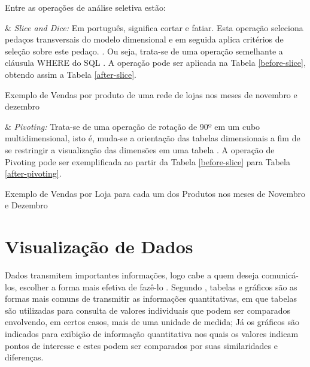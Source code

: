 Entre as operações de análise seletiva estão:

\begin{easylist}[itemize]

& \textit{Slice and Dice:} Em português, significa cortar e fatiar. Esta operação seleciona pedaços transversais do modelo dimensional e em seguida aplica critérios de seleção sobre este pedaço. \cite{andre2000}. Ou seja, trata-se de uma operação semelhante a cláusula WHERE do SQL \cite{valeria2012}. A operação pode ser aplicada na Tabela \ref{before-slice}, obtendo assim a Tabela \ref{after-slice}.


\end{easylist}

\begin{table}[ht]
\centering

\caption{Exemplo de Vendas por produto de uma rede de lojas nos meses de novembro e dezembro}
\label{before-slice}
\end{table}


\begin{table}[ht]
\centering

\label{after-slice}
\end{table}


\begin{easylist}[itemize]

& \textit{Pivoting:} Trata-se de uma operação de rotação de 90º em um cubo multidimensional, isto é, muda-se a orientação das tabelas dimensionais a fim de se restringir a visualização das dimensões em uma tabela \cite{andre2000}. A operação de Pivoting pode ser exemplificada ao partir da Tabela \ref{before-slice} para Tabela \ref{after-pivoting}.


\end{easylist}



\begin{table}[!ht]
\centering

\caption{Exemplo de Vendas por Loja para cada um dos Produtos nos meses de Novembro e Dezembro}
\label{after-pivoting}
\end{table}



\section {Visualização de Dados}

Dados transmitem importantes informações, logo cabe a quem deseja comunicá-los, escolher a forma mais efetiva de fazê-lo \cite{raquel2013}. Segundo , tabelas e gráficos são as formas mais comuns de transmitir as informações quantitativas, em que tabelas são utilizadas para consulta de valores individuais que podem ser comparados envolvendo, em certos casos, mais de uma unidade de medida; Já os gráficos são indicados para exibição de informação quantitativa nos quais os valores indicam pontos de interesse e estes podem ser comparados por suas similaridades e diferenças.
